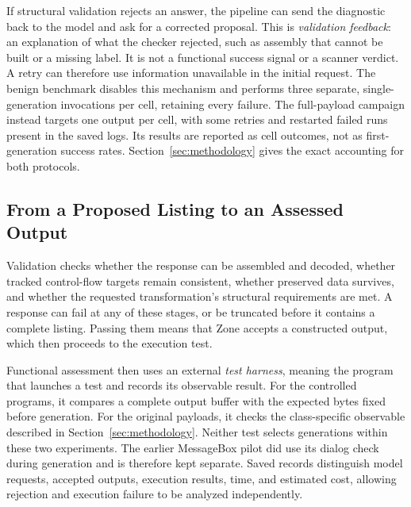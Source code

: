 If structural validation rejects an answer, the pipeline can send the
diagnostic back to the model and ask for a corrected proposal. This is
\emph{validation feedback}: an explanation of what the checker rejected,
such as assembly that cannot be built or a missing label. It is not a
functional success signal or a scanner verdict. A retry can therefore use
information unavailable in the initial request.
The benign benchmark disables
this mechanism and performs three separate, single-generation invocations
per cell, retaining every failure. The full-payload campaign instead
targets one output per cell, with some retries and restarted failed runs
present in the saved logs. Its results are reported as cell outcomes, not
as first-generation success rates. Section~\ref{sec:methodology} gives the
exact accounting for both protocols.

\subsection{From a Proposed Listing to an Assessed Output}
Validation checks whether the response can be assembled and decoded,
whether tracked control-flow targets remain consistent, whether preserved
data survives, and whether the requested transformation's structural
requirements are met. A response can fail at any of these stages, or be
truncated before it contains a complete listing. Passing them means that
Zone accepts a constructed output, which then proceeds to the execution test.

Functional assessment then uses an external \emph{test harness}, meaning
the program that launches a test and records its observable result. For
the controlled programs, it compares a complete output buffer with the expected
bytes fixed before generation. For the original payloads, it checks the
class-specific observable described in Section~\ref{sec:methodology}.
Neither test selects generations within these two experiments. The earlier
MessageBox pilot did use its dialog check during generation and is therefore
kept separate. Saved records distinguish model requests, accepted outputs,
execution results, time, and estimated cost, allowing rejection and execution
failure to be analyzed independently.
